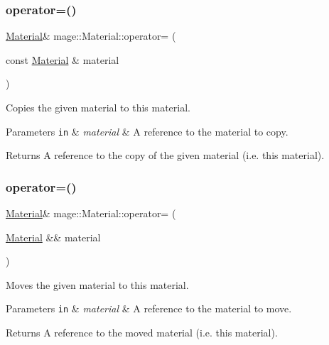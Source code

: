 \subsubsection{\texorpdfstring{operator=()}{operator=()}\hspace{0.1cm}{\footnotesize\ttfamily [1/2]}}
{\footnotesize\ttfamily \hyperlink{structmage_1_1_material}{Material}\& mage\+::\+Material\+::operator= (\begin{DoxyParamCaption}\item[{const \hyperlink{structmage_1_1_material}{Material} \&}]{material }\end{DoxyParamCaption})\hspace{0.3cm}{\ttfamily [default]}}

Copies the given material to this material.


\begin{DoxyParams}[1]{Parameters}
\mbox{\tt in}  & {\em material} & A reference to the material to copy. \\
\hline
\end{DoxyParams}
\begin{DoxyReturn}{Returns}
A reference to the copy of the given material (i.\+e. this material). 
\end{DoxyReturn}
\hypertarget{structmage_1_1_material_a500a2ebe99d4d7b3be5bf57b6bff62a1}{}\label{structmage_1_1_material_a500a2ebe99d4d7b3be5bf57b6bff62a1} 
\subsubsection{\texorpdfstring{operator=()}{operator=()}\hspace{0.1cm}{\footnotesize\ttfamily [2/2]}}
{\footnotesize\ttfamily \hyperlink{structmage_1_1_material}{Material}\& mage\+::\+Material\+::operator= (\begin{DoxyParamCaption}\item[{\hyperlink{structmage_1_1_material}{Material} \&\&}]{material }\end{DoxyParamCaption})\hspace{0.3cm}{\ttfamily [default]}}

Moves the given material to this material.


\begin{DoxyParams}[1]{Parameters}
\mbox{\tt in}  & {\em material} & A reference to the material to move. \\
\hline
\end{DoxyParams}
\begin{DoxyReturn}{Returns}
A reference to the moved material (i.\+e. this material). 
\end{DoxyReturn}
\hypertarget{structmage_1_1_material_a7a5cf55e733d2180865d5f6d9758336c}{}\label{structmage_1_1_material_a7a5cf55e733d2180865d5f6d9758336c} 
